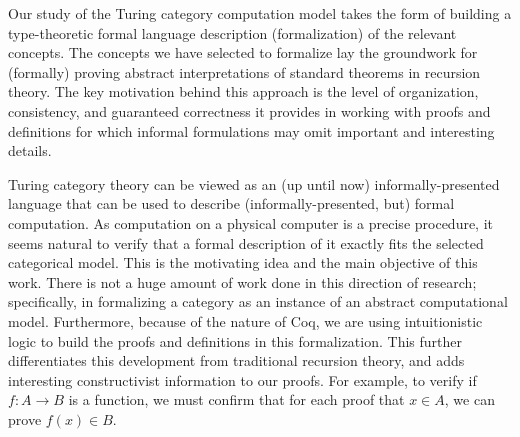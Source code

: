 \documentclass{entcs} \usepackage{entcsmacro}
\begin{document}
Our study of the Turing category computation model takes the form of building a type-theoretic formal language description (formalization) of the relevant concepts. The concepts we have selected to formalize lay the groundwork for (formally) proving abstract interpretations of standard theorems in recursion theory. The key motivation behind  this approach is the level of organization, consistency, and guaranteed correctness it provides in working with proofs and definitions for which informal formulations may omit important and interesting details. 


Turing category theory can be viewed as an (up until now) informally-presented language that can be used to describe (informally-presented, but) formal computation. As computation on a physical computer is a precise procedure, it seems natural to verify that a formal description of it exactly fits the selected categorical model. This is the motivating idea and the main objective of this work. There is not a huge amount of work done in this direction of research; specifically, in formalizing a category as an instance of an abstract computational model. Furthermore, because of the nature of Coq, we are using intuitionistic logic to build the proofs and definitions in this formalization.  This further differentiates this development from traditional recursion theory, and adds interesting constructivist information to our proofs. For example, to verify if $f: A\rightarrow B$ is a function, we must confirm that for each proof that $x\in A$, we can prove $f(x)\in B$.

\end{document}
